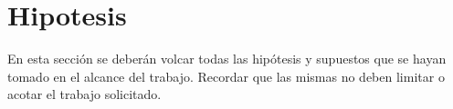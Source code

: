 \section{Hipotesis}

En esta sección se deberán volcar todas las hipótesis y supuestos que se hayan tomado en el alcance del trabajo. Recordar que las mismas no deben limitar o acotar el trabajo solicitado.